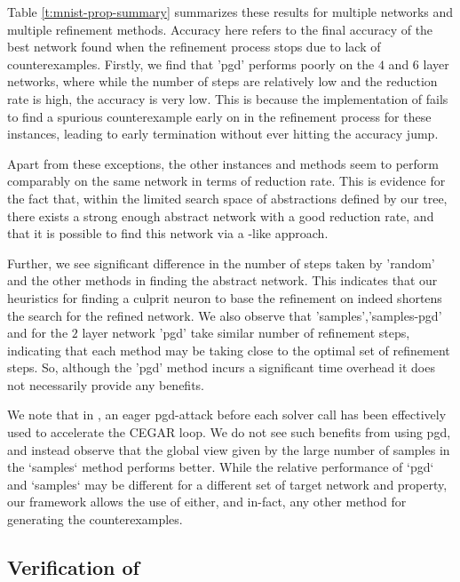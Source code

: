 Table \ref{t:mnist-prop-summary} summarizes these results for multiple \mnist
networks and multiple refinement methods. Accuracy here refers to the final
accuracy of the best network found when the refinement process stops due to lack
of counterexamples. Firstly, we find that 'pgd' performs poorly on the $4$ and
$6$ layer networks, where while the number of steps are relatively low and the
reduction rate is high, the accuracy is very low. This is because the \abcrown
implementation of \pgd fails to find a spurious counterexample early on in the
refinement process for these instances, leading to early termination without
ever hitting the accuracy jump. 

Apart from these exceptions, the other instances and methods seem to perform
comparably on the same network in terms of reduction rate. This is evidence for
the fact that, within the limited search space of abstractions defined by our
tree, there exists a strong enough abstract network with a good reduction rate,
and that it is possible to find this network via a \cegar-like approach. 

Further, we see significant difference in the number of steps taken by 'random'
and the other methods in finding the abstract network. This indicates that our
heuristics for finding a culprit neuron to base the refinement on indeed
shortens the search for the refined network. We also observe that
'samples','samples-pgd' and for the $2$ layer network 'pgd' take similar number
of refinement steps, indicating that each method may be taking close to the
optimal set of refinement steps. So, although the 'pgd' method
incurs a significant time overhead  it does not necessarily
provide any benefits. 

We note that in \cite{cleverest-nn}, an eager pgd-attack before each solver call
has been effectively used to accelerate the CEGAR loop. We do not see such
benefits from using pgd, and instead observe that the global view given by
the large number of samples in the `samples` method performs better. While the
relative performance of `pgd` and `samples` may be different for a different set
of target network and property, our framework allows the use of either, and
in-fact, any other method for generating the counterexamples.

\subsection{Verification of \acasxu}



